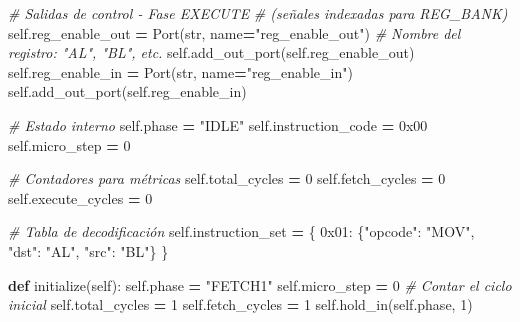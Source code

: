 \documentclass[12pt,oneside]{templates/unerthesis}
\newenvironment{Shaded}{\begin{snugshade}}{\end{snugshade}}
\newcommand{\BaseNTok}[1]{\textcolor[rgb]{0.00,0.00,0.81}{#1}}
\newcommand{\BuiltInTok}[1]{#1}
\newcommand{\CommentTok}[1]{\textcolor[rgb]{0.56,0.35,0.01}{\textit{#1}}}
\newcommand{\DecValTok}[1]{\textcolor[rgb]{0.00,0.00,0.81}{#1}}
\newcommand{\KeywordTok}[1]{\textcolor[rgb]{0.13,0.29,0.53}{\textbf{#1}}}
\newcommand{\NormalTok}[1]{#1}
\newcommand{\OperatorTok}[1]{\textcolor[rgb]{0.81,0.36,0.00}{\textbf{#1}}}
\newcommand{\StringTok}[1]{\textcolor[rgb]{0.31,0.60,0.02}{#1}}
\newcommand{\VariableTok}[1]{\textcolor[rgb]{0.00,0.00,0.00}{#1}}
\begin{document}
\begin{Shaded}
\begin{Highlighting}[]
        \CommentTok{\# Salidas de control {-} Fase EXECUTE }
        \CommentTok{\# (señales indexadas para REG\_BANK)}
        \VariableTok{self}\NormalTok{.reg\_enable\_out }\OperatorTok{=}\NormalTok{ Port(}\BuiltInTok{str}\NormalTok{, name}\OperatorTok{=}\StringTok{"reg\_enable\_out"}\NormalTok{)}
        \CommentTok{\# Nombre del registro: "AL", "BL", etc.}
        \VariableTok{self}\NormalTok{.add\_out\_port(}\VariableTok{self}\NormalTok{.reg\_enable\_out)}
        \VariableTok{self}\NormalTok{.reg\_enable\_in }\OperatorTok{=}\NormalTok{ Port(}\BuiltInTok{str}\NormalTok{, name}\OperatorTok{=}\StringTok{"reg\_enable\_in"}\NormalTok{)}
        \VariableTok{self}\NormalTok{.add\_out\_port(}\VariableTok{self}\NormalTok{.reg\_enable\_in)}
        
        \CommentTok{\# Estado interno}
        \VariableTok{self}\NormalTok{.phase }\OperatorTok{=} \StringTok{"IDLE"}
        \VariableTok{self}\NormalTok{.instruction\_code }\OperatorTok{=} \BaseNTok{0x00}
        \VariableTok{self}\NormalTok{.micro\_step }\OperatorTok{=} \DecValTok{0}
        
        \CommentTok{\# Contadores para métricas}
        \VariableTok{self}\NormalTok{.total\_cycles }\OperatorTok{=} \DecValTok{0}
        \VariableTok{self}\NormalTok{.fetch\_cycles }\OperatorTok{=} \DecValTok{0}
        \VariableTok{self}\NormalTok{.execute\_cycles }\OperatorTok{=} \DecValTok{0}
        
        \CommentTok{\# Tabla de decodificación}
        \VariableTok{self}\NormalTok{.instruction\_set }\OperatorTok{=}\NormalTok{ \{}
            \BaseNTok{0x01}\NormalTok{: \{}\StringTok{"opcode"}\NormalTok{: }\StringTok{"MOV"}\NormalTok{, }\StringTok{"dst"}\NormalTok{: }\StringTok{"AL"}\NormalTok{, }\StringTok{"src"}\NormalTok{: }\StringTok{"BL"}\NormalTok{\}}
\NormalTok{        \}}
    
    \KeywordTok{def}\NormalTok{ initialize(}\VariableTok{self}\NormalTok{):}
        \VariableTok{self}\NormalTok{.phase }\OperatorTok{=} \StringTok{"FETCH1"}
        \VariableTok{self}\NormalTok{.micro\_step }\OperatorTok{=} \DecValTok{0}
        \CommentTok{\# Contar el ciclo inicial}
        \VariableTok{self}\NormalTok{.total\_cycles }\OperatorTok{=} \DecValTok{1}
        \VariableTok{self}\NormalTok{.fetch\_cycles }\OperatorTok{=} \DecValTok{1}
        \VariableTok{self}\NormalTok{.hold\_in(}\VariableTok{self}\NormalTok{.phase, }\DecValTok{1}\NormalTok{)}
    

\end{Highlighting}
\end{Shaded}
\end{document}
